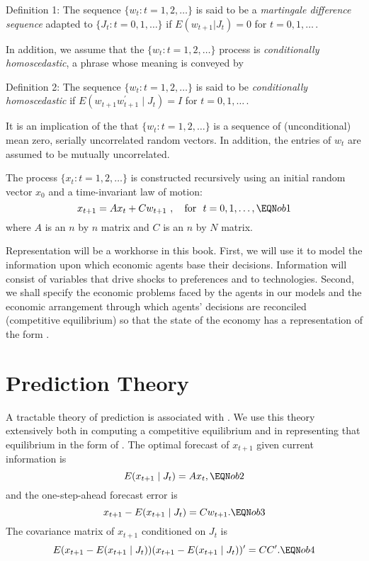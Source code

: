 \specsec
{Definition 1:} The sequence $\{w_t : t=1,2, \ldots\}$ is said to
be a {\it martingale difference sequence\/} 
adapted to $\{J_t : t=0, 1, \ldots \}$
if $E(w_{t+1} \vert J_t) = 0$ for $t=0, 1, \ldots\,$.

\medskip\noindent
In addition, we assume that the  $\{w_t : t=1,2,\ldots\}$ process is {\it conditionally
homoscedastic}, a phrase whose meaning is conveyed by

\specsec
{Definition 2:} The sequence $\{w_t : t=1,2,\ldots\}$ is said to be
{\it conditionally homoscedastic\/} if $E(w_{t+1}w_{t+1}^\prime \mid J_t) = I$
for $t=0,1, \ldots\,$.

\medskip\noindent
It is an implication of the  that $\{w_t : t=1, 2,
\ldots\}$ is a sequence of (unconditional) mean zero, serially uncorrelated
random vectors. %
 In addition, the entries of $w_t$ are assumed to be mutually uncorrelated.


The process $\{x_t : t=1,2,\ldots\}$ is constructed recursively using an
initial random vector $x_0$ and a time-invariant law of motion:
$$x_{t+1} = Ax_t + Cw_{t+1}\ ,\quad \hbox{for }\ t=0,1,\ldots ,\EQN ob1$$
where $A$ is an $n$ by $n$ matrix and $C$ is an $n$ by $N$ matrix.

Representation  will be a workhorse in this book.
 First, we will
use it to model
the information upon which economic
agents base their decisions.  Information will consist of
variables that drive shocks to preferences and to technologies.
Second, we shall specify the economic problems faced by
the agents in our models and the economic arrangement through which agents'
decisions are reconciled (competitive equilibrium) so that
the state of the economy has a representation of the form .

\section
{Prediction Theory} %
A tractable theory of prediction is associated with . We use this theory
extensively both in computing a competitive  equilibrium and in
representing that equilibrium in the form of .
The optimal forecast of $x_{t+1}$ given current information is
$$ E(x_{t+1} \mid J_t) = Ax_t , \EQN ob2 $$
and the one-step-ahead forecast error is
$$x_{t+1} - E(x_{t+1} \mid J_t) = Cw_{t+1} . \EQN ob3 $$
The covariance matrix of $x_{t+1}$ conditioned on $J_t$ is %
$$E (x_{t+1} - E ( x_{t+1} \mid J_t) ) (x_{t+1} - E ( x_{t+1} \mid J_t))^\prime
= CC^\prime . \EQN ob4 $$

